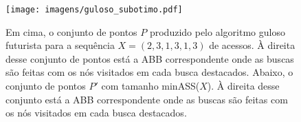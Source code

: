 \begin{comment}
        \begin{scope}[xshift=8cm] %
        \node [nodeRed] {3}
            child {node {1}
                child[missing] {}
                child {node {2}}}
            child[missing] {};
        \end{scope}
    \end{tikzpicture}
    \\
    \begin{tikzpicture}[
        level distance=1cm,
        level 1/.style={sibling distance=2cm},
        every node/.style={circle, draw=black!90, very thick, minimum size=8mm, inner sep=0pt, font=\large},
        edge from parent/.style={draw, solid, very thick},
        edge from parent path={(\tikzparentnode) -- (\tikzchildnode)},
        nodeRed/.style={circle, draw=Red, solid, minimum size=8mm, inner sep=0pt, font=\large, fill=Red!55},
        nodeBlack/.style={circle, draw=black, solid, minimum size=8mm, inner sep=0pt}
        ]
        \node [nodeRed] {3}
            child [nodeRed] {node [nodeRed] {1}
                child[missing] {}
                child [nodeBlack] {node {2}}}
            child[missing] {};
    
        \draw[->, very thick] (4,-0.5) -- (5,-0.5);
        \draw[->, very thick] (5,-1) -- (4,-1);
        \draw[->, very thick] (4,-3) -- (4,-4);
    
        \begin{scope}[xshift=8cm] %
        \node [nodeRed] {2}
            child [nodeRed] {node [nodeRed] {1}}
            child {node {3}};
        \end{scope}
    \end{tikzpicture}
    \caption{Em preto, os pontos de $P_X$ para uma sequência $X = (2,3,1,3,1,3)$ de acessos. À esquerda, o conjunto de pontos produzidos pelo Guloso futurista. À direita, o menor conjunto arboreamente satisfeito para $P_X$, de tamanho minASS$(P_X)$.}
\label{fig:greedy_subotimo}
\end{figure}
\end{comment}

\begin{figure}
    \centering
    \texttt{[image: imagens/guloso\_subotimo.pdf]}
    \caption{Em cima, o conjunto de pontos $P$ produzido pelo algoritmo guloso futurista para a sequência $X = (2,3,1,3,1,3)$ de acessos. À direita desse conjunto de pontos está a ABB correspondente onde as buscas são feitas com os nós visitados em cada busca destacados. Abaixo, o conjunto de pontos $P'$ com tamanho minASS($X$). À direita desse conjunto está a ABB correspondente onde as buscas são feitas com os nós visitados em cada busca destacados.}
\label{fig:greedy_subotimo}
\end{figure}

